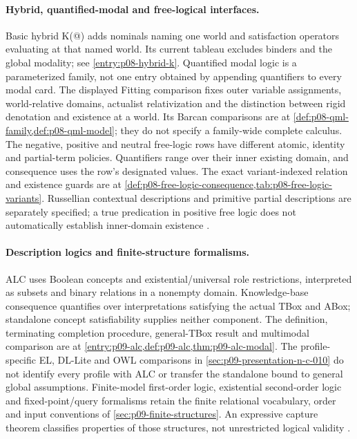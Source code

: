\paragraph{Hybrid, quantified-modal and free-logical interfaces.}
\label{entry:p14-directory-domain-variants}
Basic hybrid K(@) adds nominals naming one world and satisfaction
operators evaluating at that named world. Its current tableau excludes
binders and the global modality; see \cref{entry:p08-hybrid-k}.
Quantified modal logic is a parameterized family, not one entry obtained
by appending quantifiers to every modal card. The displayed Fitting
comparison fixes outer variable assignments, world-relative domains,
actualist relativization and the distinction between rigid denotation
and existence at a world. Its Barcan comparisons are at
\cref{def:p08-qml-family,def:p08-qml-model}; they do not specify a
family-wide complete calculus.
The negative, positive and neutral free-logic rows have different
atomic, identity and partial-term policies. Quantifiers range over their
inner existing domain, and consequence uses the row's designated values.
The exact variant-indexed relation and existence guards are at
\cref{def:p08-free-logic-consequence,tab:p08-free-logic-variants}.
Russellian contextual descriptions and primitive partial descriptions
are separately specified; a true predication in positive free logic
does not automatically establish inner-domain existence
\cite{ArecesTenCate2007,Fitting2002Alethic,FittingMendelsohn1998,
Lambert1967,Bencivenga1986,Lehmann2002,Russell1905}.

\paragraph{Description logics and finite-structure formalisms.}
\label{entry:p14-directory-description}
ALC uses Boolean concepts and existential/universal role restrictions,
interpreted as subsets and binary relations in a nonempty domain.
Knowledge-base consequence quantifies over interpretations satisfying
the actual TBox and ABox; standalone concept satisfiability supplies
neither component. The definition, terminating completion procedure,
general-TBox result and multimodal comparison are at
\cref{entry:p09-alc,def:p09-alc,thm:p09-alc-modal}.
The profile-specific EL, DL-Lite and OWL comparisons in
\cref{sec:p09-presentation-n-c-010} do not identify every profile with
ALC or transfer the standalone bound to general global assumptions.
Finite-model first-order logic, existential second-order logic and
fixed-point/query formalisms retain the finite relational vocabulary,
order and input conventions of \cref{sec:p09-finite-structures}.
An expressive capture theorem classifies properties of those structures,
not unrestricted logical validity \cite{Schild1991,SchmidtSchaussSmolka1991,
BaaderHorrocksLutzSattler2017,Libkin2004}.

